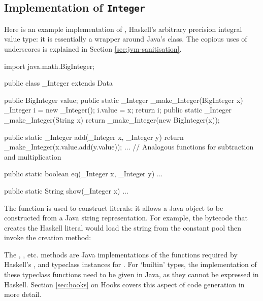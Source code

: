 \documentclass[dissertation.tex]{subfiles}
\begin{document}
\begin{appendices}
\chapter{Implementation of \texttt{Integer}}\label{appendix:integer-literal}
{
    Here is an example implementation of , Haskell's arbitrary precision integral value type: it is essentially a wrapper around Java's  class. The copious uses of underscores is explained in Section \ref{sec:jvm-sanitisation}.

    \begin{javafigure}
    import java.math.BigInteger;

    public class _Integer extends Data {
        public BigInteger value;
        public static _Integer _make_Integer(BigInteger x) {
            _Integer i = new _Integer();
            i.value = x;
            return i;
        }
        public static _Integer _make_Integer(String x) {
            return _make_Integer(new BigInteger(x));
        }

        public static _Integer add(_Integer x, _Integer y) {
            return _make_Integer(x.value.add(y.value));
        }
        ... // Analogous functions for subtraction and multiplication

        public static boolean eq(_Integer x, _Integer y) { ... }

        public static String show(_Integer x) { ... }
    }
    \end{javafigure}

    The  function is used to construct  literals: it allows a Java  object to be constructed from a Java string representation. For example, the bytecode that creates the Haskell literal  would load the string  from the constant pool then invoke the creation method:


    The , , etc. methods are Java implementations of the functions required by Haskell's ,  and  typeclass instances for . For `builtin' types, the implementation of these typeclass functions need to be given in Java, as they cannot be expressed in Haskell. Section \ref{sec:hooks} on Hooks covers this aspect of code generation in more detail.
}

\end{appendices}
\end{document}
